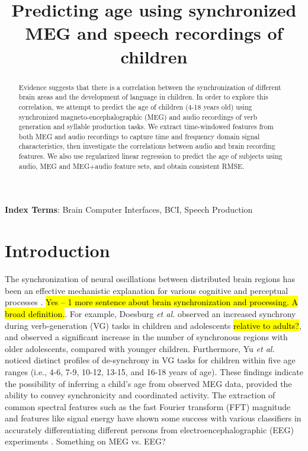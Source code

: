 \documentclass[a4paper]{article}
\title{Predicting age using synchronized MEG and speech recordings of children}
\newcommand{\FR}[1]{{\small \textcolor{red}{\hl{#1}}}}
\begin{document}
\maketitle
% 
\begin{abstract}
Evidence suggests that there is a correlation between the synchronization of different brain areas and the development of language in children. In order to explore this correlation, we attempt to predict the age of children (4-18 years old) using synchronized magneto-encephalographic (MEG) and audio recordings of verb generation and syllable production tasks. We extract time-windowed features from both MEG and audio recordings to capture time and frequency domain signal characteristics, then investigate the correlations between audio and brain recording features. We also use regularized linear regression to predict the age of subjects using audio, MEG and MEG+audio feature sets, and obtain consistent RMSE.
\end{abstract}


\noindent\textbf{Index Terms}: Brain Computer Interfaces, BCI, Speech Production

\section{Introduction}

The synchronization of neural oscillations between distributed brain regions has been an effective mechanistic explanation for various cognitive and perceptual processes \cite{Fries2015,Nakasaki1989,NeuralSync}. \FR{Yes -- 1 more sentence about brain synchronization and processing. A broad definition.}. For example, Doesburg {\em et al.} \cite{Doesburg2016} observed an increased synchrony during verb-generation (VG) tasks in children and adolescents \FR{relative to adults?}, and observed a significant increase in the number of synchronous regions with older adolescents, compared with younger children. Furthermore, Yu {\em et al.} \cite{Yu2014} noticed distinct profiles of de-synchrony in VG tasks for children within five age ranges (i.e., 4-6, 7-9, 10-12, 13-15, and 16-18 years of age). These findings indicate the possibility of inferring a child's age from observed MEG data, provided the ability to convey synchronicity and coordinated activity. The extraction of common spectral features such as the fast Fourier transform (FFT) magnitude and features like signal energy have shown some success with various classifiers in accurately differentiating different persons from electroencephalographic (EEG) experiments \cite{Nguyen2012} \cite{Poulos2001}. Something on MEG vs. EEG?
\end{document}
